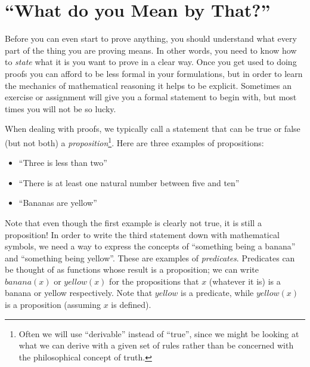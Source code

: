 \documentclass{tufte-handout}
\newcounter{example}
\begin{document}
\section{``What do you Mean by That?''}

Before you can even start to prove anything, you should understand
what every part of the thing you are proving means. In other
words, you need to know how to \emph{state} what it is you want to
prove in a clear way. Once you get used to doing proofs you can
afford to be less formal in your formulations, but in order to
learn the mechanics of mathematical reasoning it helps to be
explicit.
%
Sometimes an exercise or assignment will give you a formal
statement to begin with, but most times you will not be so lucky.

When dealing with proofs, we typically call a statement that can
be true or false (but not both) a
\emph{proposition}\footnote{Often we will use ``derivable''
  instead of ``true'', since we might be looking at what we can
  derive with a given set of rules rather than be concerned with
  the philosophical concept of truth. }. Here are three examples
of propositions:
\begin{itemize}
\item ``Three is less than two''
\item ``There is at least one natural number between five
and ten''
\item ``Bananas are yellow''
\end{itemize}

\noindent
Note that even though the first example is clearly not true, it is
still a proposition!
%
In order to write the third statement down with mathematical
symbols, we need a way to express the concepts of ``something
being a banana'' and ``something being yellow''. These are
examples of \emph{predicates}. Predicates can be thought of as
functions whose result is a proposition; we can write
$\mathit{banana}(x)$ or $\mathit{yellow}(x)$ for the propositions
that $x$ (whatever it is) is a banana or yellow respectively. Note
that $\mathit{yellow}$ is a predicate, while $\mathit{yellow}(x)$
is a proposition (assuming $x$ is defined).

\end{document}
